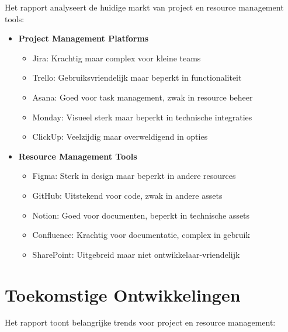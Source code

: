 Het \textcite{GitLab2023} rapport analyseert de huidige markt van project en resource management tools:

\begin{itemize}
    \item \textbf{Project Management Platforms}
    \begin{itemize}
        \item Jira: Krachtig maar complex voor kleine teams
        \item Trello: Gebruiksvriendelijk maar beperkt in functionaliteit
        \item Asana: Goed voor task management, zwak in resource beheer
        \item Monday: Visueel sterk maar beperkt in technische integraties
        \item ClickUp: Veelzijdig maar overweldigend in opties
    \end{itemize}
    
    \item \textbf{Resource Management Tools}
    \begin{itemize}
        \item Figma: Sterk in design maar beperkt in andere resources
        \item GitHub: Uitstekend voor code, zwak in andere assets
        \item Notion: Goed voor documenten, beperkt in technische assets
        \item Confluence: Krachtig voor documentatie, complex in gebruik
        \item SharePoint: Uitgebreid maar niet ontwikkelaar-vriendelijk
    \end{itemize}
\end{itemize}

\section{Toekomstige Ontwikkelingen}
\label{sec:toekomst}

Het \textcite{StateOfAgile2023} rapport toont belangrijke trends voor project en resource management:

